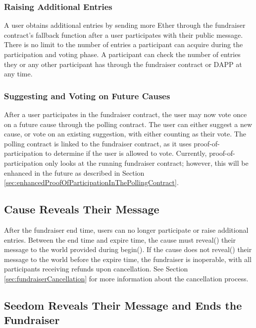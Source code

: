 \documentclass[11pt]{article}
\begin{document}
\subsubsection{Raising Additional Entries}

A user obtains additional entries by sending more Ether through the fundraiser contract's fallback function after a user participates with their public message. There is no limit to the number of entries a participant can acquire during the participation and voting phase. A participant can check the number of entries they or any other participant has through the fundraiser contract or DAPP at any time.

\subsubsection{Suggesting and Voting on Future Causes}

After a user participates in the fundraiser contract, the user may now vote once on a future cause through the polling contract. The user can either suggest a new cause, or vote on an existing suggestion, with either counting as their vote. The polling contract is linked to the fundraiser contract, as it uses proof-of-participation to determine if the user is allowed to vote. Currently, proof-of-participation only looks at the running fundraiser contract; however, this will be enhanced in the future as described in Section \ref{sec:enhancedProofOfParticipationInThePollingContract}.

\subsection{Cause Reveals Their Message}

After the fundraiser end time, users can no longer participate or raise additional entries. Between the end time and expire time, the cause must reveal() their message to the world provided during begin(). If the cause does not reveal() their message to the world before the expire time, the fundraiser is inoperable, with all participants receiving refunds upon cancellation. See Section \ref{sec:fundraiserCancellation} for more information about the cancellation process.

\subsection{Seedom Reveals Their Message and Ends the Fundraiser}
\label{sec:seedomRevealsTheirMessageAndEndsTheFundraiser}
\end{document}
